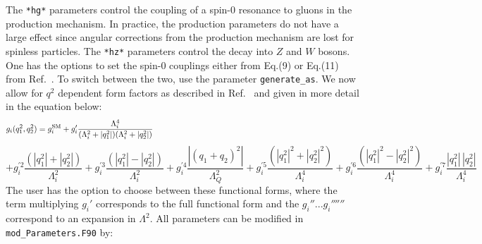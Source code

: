 \documentclass[aps,superscriptaddress,nofootinbib]{revtex4}
\begin{document}
\noindent
The \verb|*hg*| parameters control the coupling of a spin-0 resonance to gluons in the production mechanism.
In practice, the production parameters do not have a large effect since angular corrections from the production mechanism are lost for spinless particles.
The \verb|*hz*| parameters control the decay into $Z$ and $W$ bosons.
One has the options to set the spin-0 couplings either from Eq.(9) or Eq.(11) from Ref.~\cite{Bolognesi:2012}.
To switch between the two, use the parameter \verb|generate_as|.
We now allow for $q^2$ dependent form factors as described in Ref.~\cite{Anderson:2013} and given in more detail in the equation below:
\[
g_i(q_1^2,q_2^2) =
g_i^{\rm SM}
+ g_i' \frac{\Lambda_i^4}{(\Lambda_i^2 + |q_1^2|)(\Lambda_i^2 + |q_2^2|)}
~~~~~~~~~~~~~~~~~~~~~~~~~~~~~~~~~~~~~~~~~~~~~~~~~~~~~~~~~~~~~~~~~~~~~~~~~~~~~~
\]
\[
+ g_i^{\prime 2}  \frac{(|q_1^2|+|q_2^2|)}{\Lambda_i^2}
+ g_i^{\prime 3}  \frac{(|q_1^2|-|q_2^2|)}{\Lambda_i^2}
+ g_i^{\prime 4}  \frac{|(q_1+q_2)^2|}{\Lambda_Q^2}
+ g_i^{\prime 5}  \frac{(|q_1^2|^2+|q_2^2|^2)}{\Lambda_i^4}
+ g_i^{\prime 6}  \frac{(|q_1^2|^2-|q_2^2|^2)}{\Lambda_i^4}
+ g_i^{\prime 7}  \frac{|q_1^2| \, |q_2^2|}{\Lambda_i^4}
\]
\noindent
The user has the option to choose between these functional forms,
where the term multiplying $g_i'$ corresponds to the full functional form and the $g_i''... g_i'''''' $ correspond to an expansion in $\Lambda^2$.
All parameters can be modified in \verb|mod_Parameters.F90| by:
\end{document}
